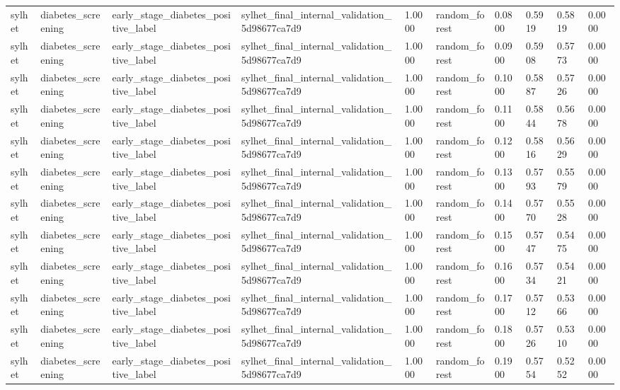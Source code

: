 \begin{tabular}{llllllllll}
sylhet & diabetes\_screening & early\_stage\_diabetes\_positive\_label & sylhet\_final\_internal\_validation\_5d98677ca7d9 & 1.0000 & random\_forest & 0.0800 & 0.5919 & 0.5819 & 0.0000 \\
sylhet & diabetes\_screening & early\_stage\_diabetes\_positive\_label & sylhet\_final\_internal\_validation\_5d98677ca7d9 & 1.0000 & random\_forest & 0.0900 & 0.5908 & 0.5773 & 0.0000 \\
sylhet & diabetes\_screening & early\_stage\_diabetes\_positive\_label & sylhet\_final\_internal\_validation\_5d98677ca7d9 & 1.0000 & random\_forest & 0.1000 & 0.5887 & 0.5726 & 0.0000 \\
sylhet & diabetes\_screening & early\_stage\_diabetes\_positive\_label & sylhet\_final\_internal\_validation\_5d98677ca7d9 & 1.0000 & random\_forest & 0.1100 & 0.5844 & 0.5678 & 0.0000 \\
sylhet & diabetes\_screening & early\_stage\_diabetes\_positive\_label & sylhet\_final\_internal\_validation\_5d98677ca7d9 & 1.0000 & random\_forest & 0.1200 & 0.5816 & 0.5629 & 0.0000 \\
sylhet & diabetes\_screening & early\_stage\_diabetes\_positive\_label & sylhet\_final\_internal\_validation\_5d98677ca7d9 & 1.0000 & random\_forest & 0.1300 & 0.5793 & 0.5579 & 0.0000 \\
sylhet & diabetes\_screening & early\_stage\_diabetes\_positive\_label & sylhet\_final\_internal\_validation\_5d98677ca7d9 & 1.0000 & random\_forest & 0.1400 & 0.5770 & 0.5528 & 0.0000 \\
sylhet & diabetes\_screening & early\_stage\_diabetes\_positive\_label & sylhet\_final\_internal\_validation\_5d98677ca7d9 & 1.0000 & random\_forest & 0.1500 & 0.5747 & 0.5475 & 0.0000 \\
sylhet & diabetes\_screening & early\_stage\_diabetes\_positive\_label & sylhet\_final\_internal\_validation\_5d98677ca7d9 & 1.0000 & random\_forest & 0.1600 & 0.5734 & 0.5421 & 0.0000 \\
sylhet & diabetes\_screening & early\_stage\_diabetes\_positive\_label & sylhet\_final\_internal\_validation\_5d98677ca7d9 & 1.0000 & random\_forest & 0.1700 & 0.5712 & 0.5366 & 0.0000 \\
sylhet & diabetes\_screening & early\_stage\_diabetes\_positive\_label & sylhet\_final\_internal\_validation\_5d98677ca7d9 & 1.0000 & random\_forest & 0.1800 & 0.5726 & 0.5310 & 0.0000 \\
sylhet & diabetes\_screening & early\_stage\_diabetes\_positive\_label & sylhet\_final\_internal\_validation\_5d98677ca7d9 & 1.0000 & random\_forest & 0.1900 & 0.5754 & 0.5252 & 0.0000 \\

\end{tabular}
